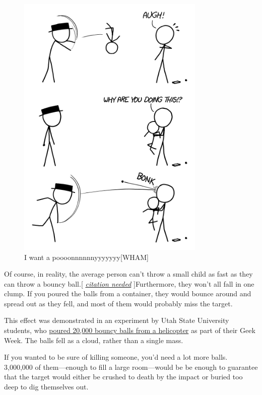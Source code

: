 {\begin{figure}[!htbp]
\centering
\includegraphics[scale=0.5, max width=0.8\textwidth]{imgs/a/52/bouncy_child.png}
\caption{I want a poooonnnnnnyyyyyyy[WHAM]}
\end{figure}

{Of course, in reality, the average person can't throw a small child as fast as they can throw a bouncy ball.[ \emph{ \href{http://en.wikipedia.org/wiki/Cetacean}{citation needed}} ]Furthermore, they won't all fall in one clump. If you poured the balls from a container, they would bounce around and spread out as they fell, and most of them would probably miss the target.}

{This effect was demonstrated in an experiment by Utah State University students, who \href{http://www.youtube.com/watch?v=fd7D1LWzWmo}{poured 20,000 bouncy balls from a helicopter} as part of their Geek Week. The balls fell as a cloud, rather than a single mass.}

{If you wanted to be sure of killing someone, you'd need a lot more balls. 3,000,000 of them—enough to fill a large room—would be be enough to guarantee that the target would either be crushed to death by the impact or buried too deep to dig themselves out.}

}
